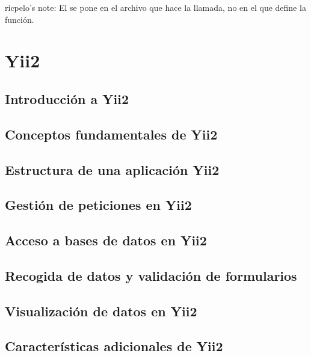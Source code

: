 \documentclass[a4paper,12pt,spanish]{sphinxmanual}
\begin{document}
ricpelo’s note: El  se pone en el archivo
que hace la llamada, no en el que define la función.


\part{Yii2}
\label{\detokenize{yii2:yii2}}\label{\detokenize{yii2::doc}}

\chapter{Introducción a Yii2}
\label{\detokenize{yii2:introduccion-a-yii2}}

\chapter{Conceptos fundamentales de Yii2}
\label{\detokenize{yii2:conceptos-fundamentales-de-yii2}}

\chapter{Estructura de una aplicación Yii2}
\label{\detokenize{yii2:estructura-de-una-aplicacion-yii2}}

\chapter{Gestión de peticiones en Yii2}
\label{\detokenize{yii2:gestion-de-peticiones-en-yii2}}

\chapter{Acceso a bases de datos en Yii2}
\label{\detokenize{yii2:acceso-a-bases-de-datos-en-yii2}}

\chapter{Recogida de datos y validación de formularios}
\label{\detokenize{yii2:recogida-de-datos-y-validacion-de-formularios}}

\chapter{Visualización de datos en Yii2}
\label{\detokenize{yii2:visualizacion-de-datos-en-yii2}}

\chapter{Características adicionales de Yii2}
\label{\detokenize{yii2:caracteristicas-adicionales-de-yii2}}
\end{document}
